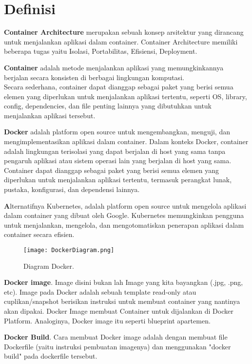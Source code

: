 \section{Definisi}

\textbf{Container Architecture} merupakan sebuah konsep arsitektur yang dirancang untuk menjalankan aplikasi dalam container. Container Architecture memiliki beberapa tugas yaitu Isolasi, Portabilitas, Efisiensi, Deployment.

\textbf{Container} adalah metode menjalankan aplikasi yang memungkinkannya berjalan secara konsisten di berbagai lingkungan komputasi.\\ 
Secara sederhana, container dapat dianggap sebagai paket yang berisi semua elemen yang diperlukan untuk menjalankan aplikasi tertentu, seperti OS, library, config, dependencies, dan file penting lainnya yang dibutuhkan untuk menjalankan aplikasi tersebut.

\textbf{Docker} adalah platform open source untuk mengembangkan, menguji, dan mengimplementasikan aplikasi dalam container. 
Dalam konteks Docker, container adalah lingkungan terisolasi yang dapat berjalan di host yang sama tanpa pengaruh aplikasi atau sistem operasi lain yang berjalan di host yang sama. Container dapat dianggap sebagai paket yang berisi semua elemen yang diperlukan untuk menjalankan aplikasi tertentu, termasuk perangkat lunak, pustaka, konfigurasi, dan dependensi lainnya.

\textbf Alternatifnya {Kubernetes}, adalah platform open source untuk mengelola aplikasi dalam container yang dibuat oleh Google. Kubernetes memungkinkan pengguna untuk menjalankan, mengelola, dan mengotomatiskan penerapan aplikasi dalam container secara efisien.

\begin{figure}[h]
    \centering
    \texttt{[image: DockerDiagram.png]}
    \caption{Diagram Docker.}
    \label{fig:ContainerDiagram}
\end{figure}

\textbf{Docker image}. Image disini bukan lah Image yang kita bayangkan (.jpg, .png, etc). Image pada Docker adalah sebuah template read-only atau cuplikan/snapshot berisikan instruksi untuk membuat container yang nantinya akan dipakai. Docker Image membuat Container untuk dijalankan di Docker Platform. Analoginya, Docker image itu seperti blueprint apartemen. 

\textbf{Docker Build}. Cara membuat Docker image adalah dengan membuat file Dockerfile (yaitu instruksi pembuatan imagenya) dan menggunakan "docker build" pada dockerfile tersebut. 

